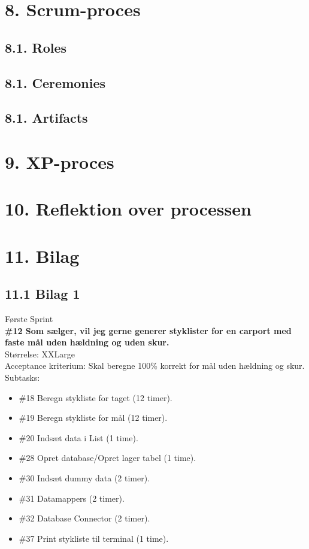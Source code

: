 \documentclass[11pt]{report}
\begin{document}
\chapter*{8. Scrum-proces}
\section*{8.1. Roles}
\section*{8.1. Ceremonies}
\section*{8.1. Artifacts}


\chapter*{9. XP-proces}


\chapter*{10. Reflektion over processen}


\chapter*{11. Bilag}
\section*{11.1 Bilag 1}

Første Sprint\\
\textbf{\#12 Som sælger, vil jeg gerne generer styklister for en carport med faste mål uden hældning og uden skur.}\\
Størrelse: XXLarge\\
Acceptance kriterium: Skal beregne 100\% korrekt for mål uden hældning og skur.\\
Subtasks:
\begin{itemize}
\item \#18 Beregn stykliste for taget (12 timer).
\item \#19 Beregn stykliste for mål (12 timer).
\item \#20 Indsæt data i List (1 time).
\item \#28 Opret database/Opret lager tabel (1 time).
\item \#30 Indsæt dummy data (2 timer).
\item \#31 Datamappers (2 timer).
\item \#32 Database Connector (2 timer).
\item \#37 Print stykliste til terminal (1 time).
\end{itemize}
\leavevmode
\end{document}
